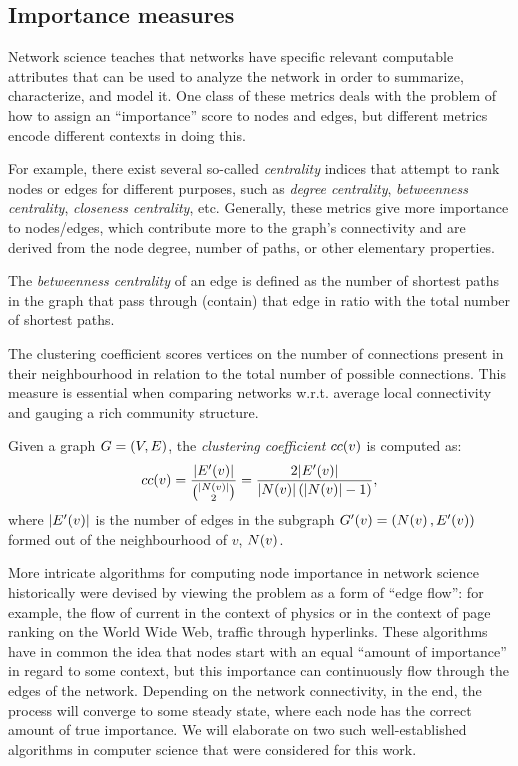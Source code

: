 \subsection{Importance measures}

Network science teaches that networks have specific relevant computable attributes that can be used to analyze the network in order to summarize, characterize, and model it. One class of these metrics deals with the problem of how to assign an \enquote{importance} score to nodes and edges, but different metrics encode different contexts in doing this.

For example, there exist several so-called \emph{centrality} indices that attempt to rank nodes or edges for different purposes, such as \emph{degree centrality}, \emph{betweenness centrality}, \emph{closeness centrality}, etc. Generally, these metrics give more importance to nodes/edges, which contribute more to the graph's connectivity and are derived from the node degree, number of paths, or other elementary properties.

\begin{definition}
The \emph{betweenness centrality} of an edge is defined as the number of shortest paths in the graph that pass through (contain) that edge in ratio with the total number of shortest paths.
\end{definition}

The clustering coefficient scores vertices on the number of connections present in their neighbourhood in relation to the total number of possible connections. This measure is essential when comparing networks w.r.t. average local connectivity and gauging a rich community structure.

\begin{definition}
Given a graph $G=\mathopen{}\left(V, E\right)$, the \emph{clustering coefficient} $cc\mathopen{}\left(v\right)$ is computed as: \begin{equation}
cc\mathopen{}\left(v\right)=\frac{\mathopen{}\left|E'\mathopen{}\left(v\right)\right|}{\binom{\mathopen{}\left|N\mathopen{}\left(v\right)\right|}{2}} = \frac{2\mathopen{}\left|E'\mathopen{}\left(v\right)\right|}{\mathopen{}\left|N\mathopen{}\left(v\right)\right|\mathopen{}\left(\mathopen{}\left|N\mathopen{}\left(v\right)\right|-1\right)},\end{equation}
where $\mathopen{}\left|E'\mathopen{}\left(v\right)\right|$ is the number of edges in the subgraph $G'\mathopen{}\left(v\right)=\mathopen{}\left(N\mathopen{}\left(v\right), E'\mathopen{}\left(v\right)\right)$ formed out of the neighbourhood of $v$, $N\mathopen{}\left(v\right)$.
\end{definition}

More intricate algorithms for computing node importance in network science historically were devised by viewing the problem as a form of \enquote{edge flow}: for example, the flow of current in the context of physics or in the context of page ranking on the World Wide Web, traffic through hyperlinks. These algorithms have in common the idea that nodes start with an equal \enquote{amount of importance} in regard to some context, but this importance can continuously flow through the edges of the network. Depending on the network connectivity, in the end, the process will converge to some steady state, where each node has the correct amount of true importance. We will elaborate on two such well-established algorithms in computer science that were considered for this work.

